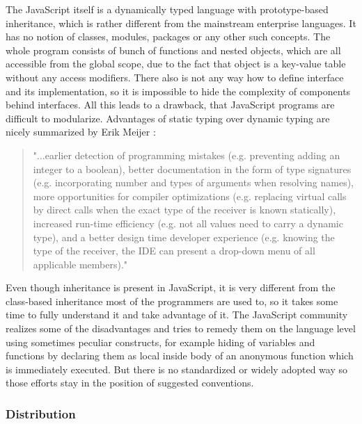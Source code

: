 \documentclass[12pt,a4paper]{report}
\begin{document}
The JavaScript itself is a dynamically typed language with prototype-based inheritance, which is rather different from the mainstream enterprise languages. It has no notion of classes, modules, packages or any other such concepts. The whole program consists of bunch of functions and nested objects, which are all accessible from the global scope, due to the fact that object is a key-value table without any access modifiers. There also is not any way how to define interface and its implementation, so it is impossible to hide the complexity of components behind interfaces. All this leads to a drawback, that JavaScript programs are difficult to modularize. Advantages of static typing over dynamic typing are nicely summarized by Erik Meijer \cite{Meijer}: 

\begin{quote}
"...earlier detection of programming mistakes (e.g. preventing adding an integer to a boolean), better documentation in the form of type signatures (e.g. incorporating number and types of arguments when resolving names), more opportunities for compiler optimizations (e.g. replacing virtual calls by direct calls when the exact type of the receiver is known statically), increased run-time efficiency (e.g. not all values need to carry a dynamic type), and a better design time developer experience (e.g. knowing the type of the receiver, the IDE can present a drop-down menu of all applicable members)."
\end{quote}

Even though inheritance is present in JavaScript, it is very different from the class-based inheritance most of the programmers are used to, so it takes some time to fully understand it and take advantage of it. The JavaScript community realizes some of the disadvantages and tries to remedy them on the language level using sometimes peculiar constructs, for example hiding of variables and functions by declaring them as local inside body of an anonymous function which is immediately executed. But there is no standardized or widely adopted way so those efforts stay in the position of suggested conventions.

\subsubsection*{Distribution} 
\end{document}
